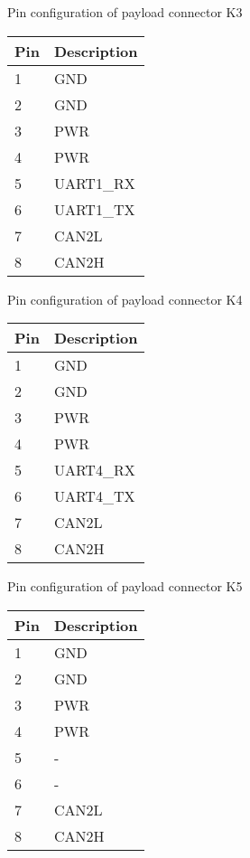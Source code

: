 \begin{appendix}
		\caption{Pin configuration of payload  connector K3}
		\begin{center}
			
			
			\begin{tabular}{p{3cm}p{3cm}}
				\toprule
				
				Pin & Description \\ \midrule
				1 & GND \\ 
				2 & GND \\ 
				3 & PWR \\ 
				4 & PWR \\ 
				5 & UART1\_RX \\ 
				6 & UART1\_TX \\ 
				7 & CAN2L \\ 
				8 & CAN2H \\ 
				\bottomrule
			\end{tabular}
			\label{k3}
		\end{center}
	
		\caption{Pin configuration of payload  connector K4}
		\begin{center}
			
			
			\begin{tabular}{p{3cm}p{3cm}}
				\toprule
				
				Pin & Description \\ \midrule
				1 & GND \\ 
				2 & GND \\ 
				3 & PWR \\ 
				4 & PWR \\ 
				5 & UART4\_RX \\ 
				6 & UART4\_TX \\ 
				7 & CAN2L \\ 
				8 & CAN2H \\ 
				\bottomrule
			\end{tabular}
			\label{k4}
		\end{center}
		
			\caption{Pin configuration of payload  connector K5}
			\begin{center}
				
				
				\begin{tabular}{p{3cm}p{3cm}}
					\toprule
					
					Pin & Description \\ \midrule
					1 & GND \\ 
					2 & GND \\ 
					3 & PWR \\ 
					4 & PWR \\ 
					5 & -\\ 
					6 & -\\ 
					7 & CAN2L \\ 
					8 & CAN2H \\ 
					\bottomrule
				\end{tabular}
				\label{k5}
			\end{center}
		

\end{appendix}

